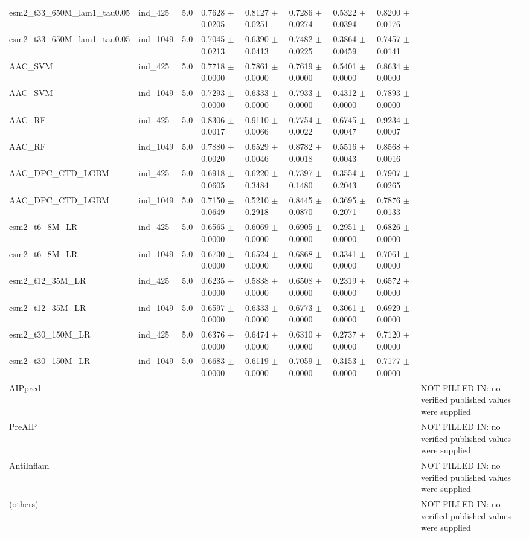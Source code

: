 \begin{table}[ht]
\begin{tabular}{lllllllll}
esm2\_t33\_650M\_lam1\_tau0.05 & ind\_425 & 5.0 & 0.7628 $\pm$ 0.0205 & 0.8127 $\pm$ 0.0251 & 0.7286 $\pm$ 0.0274 & 0.5322 $\pm$ 0.0394 & 0.8200 $\pm$ 0.0176 &  \\
esm2\_t33\_650M\_lam1\_tau0.05 & ind\_1049 & 5.0 & 0.7045 $\pm$ 0.0213 & 0.6390 $\pm$ 0.0413 & 0.7482 $\pm$ 0.0225 & 0.3864 $\pm$ 0.0459 & 0.7457 $\pm$ 0.0141 &  \\
AAC\_SVM & ind\_425 & 5.0 & 0.7718 $\pm$ 0.0000 & 0.7861 $\pm$ 0.0000 & 0.7619 $\pm$ 0.0000 & 0.5401 $\pm$ 0.0000 & 0.8634 $\pm$ 0.0000 &  \\
AAC\_SVM & ind\_1049 & 5.0 & 0.7293 $\pm$ 0.0000 & 0.6333 $\pm$ 0.0000 & 0.7933 $\pm$ 0.0000 & 0.4312 $\pm$ 0.0000 & 0.7893 $\pm$ 0.0000 &  \\
AAC\_RF & ind\_425 & 5.0 & 0.8306 $\pm$ 0.0017 & 0.9110 $\pm$ 0.0066 & 0.7754 $\pm$ 0.0022 & 0.6745 $\pm$ 0.0047 & 0.9234 $\pm$ 0.0007 &  \\
AAC\_RF & ind\_1049 & 5.0 & 0.7880 $\pm$ 0.0020 & 0.6529 $\pm$ 0.0046 & 0.8782 $\pm$ 0.0018 & 0.5516 $\pm$ 0.0043 & 0.8568 $\pm$ 0.0016 &  \\
AAC\_DPC\_CTD\_LGBM & ind\_425 & 5.0 & 0.6918 $\pm$ 0.0605 & 0.6220 $\pm$ 0.3484 & 0.7397 $\pm$ 0.1480 & 0.3554 $\pm$ 0.2043 & 0.7907 $\pm$ 0.0265 &  \\
AAC\_DPC\_CTD\_LGBM & ind\_1049 & 5.0 & 0.7150 $\pm$ 0.0649 & 0.5210 $\pm$ 0.2918 & 0.8445 $\pm$ 0.0870 & 0.3695 $\pm$ 0.2071 & 0.7876 $\pm$ 0.0133 &  \\
esm2\_t6\_8M\_LR & ind\_425 & 5.0 & 0.6565 $\pm$ 0.0000 & 0.6069 $\pm$ 0.0000 & 0.6905 $\pm$ 0.0000 & 0.2951 $\pm$ 0.0000 & 0.6826 $\pm$ 0.0000 &  \\
esm2\_t6\_8M\_LR & ind\_1049 & 5.0 & 0.6730 $\pm$ 0.0000 & 0.6524 $\pm$ 0.0000 & 0.6868 $\pm$ 0.0000 & 0.3341 $\pm$ 0.0000 & 0.7061 $\pm$ 0.0000 &  \\
esm2\_t12\_35M\_LR & ind\_425 & 5.0 & 0.6235 $\pm$ 0.0000 & 0.5838 $\pm$ 0.0000 & 0.6508 $\pm$ 0.0000 & 0.2319 $\pm$ 0.0000 & 0.6572 $\pm$ 0.0000 &  \\
esm2\_t12\_35M\_LR & ind\_1049 & 5.0 & 0.6597 $\pm$ 0.0000 & 0.6333 $\pm$ 0.0000 & 0.6773 $\pm$ 0.0000 & 0.3061 $\pm$ 0.0000 & 0.6929 $\pm$ 0.0000 &  \\
esm2\_t30\_150M\_LR & ind\_425 & 5.0 & 0.6376 $\pm$ 0.0000 & 0.6474 $\pm$ 0.0000 & 0.6310 $\pm$ 0.0000 & 0.2737 $\pm$ 0.0000 & 0.7120 $\pm$ 0.0000 &  \\
esm2\_t30\_150M\_LR & ind\_1049 & 5.0 & 0.6683 $\pm$ 0.0000 & 0.6119 $\pm$ 0.0000 & 0.7059 $\pm$ 0.0000 & 0.3153 $\pm$ 0.0000 & 0.7177 $\pm$ 0.0000 &  \\
AIPpred &  &  &  &  &  &  &  & NOT FILLED IN: no verified published values were supplied \\
PreAIP &  &  &  &  &  &  &  & NOT FILLED IN: no verified published values were supplied \\
AntiInflam &  &  &  &  &  &  &  & NOT FILLED IN: no verified published values were supplied \\
(others) &  &  &  &  &  &  &  & NOT FILLED IN: no verified published values were supplied \\
\hline
\end{tabular}
\end{table}
